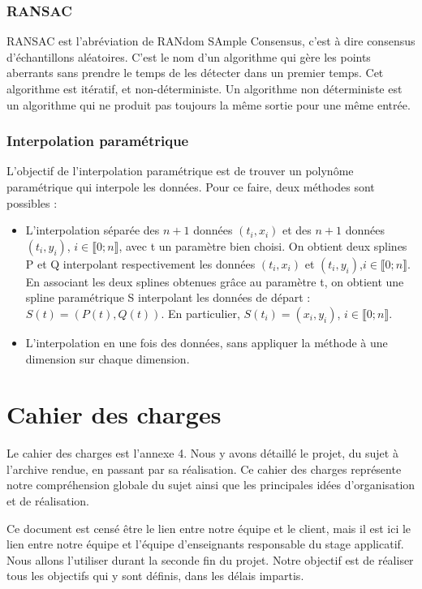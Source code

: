 \documentclass[a4paper,12pt]{article} %
\begin{document}
\subsubsection*{RANSAC}

RANSAC est l'abréviation de RANdom SAmple Consensus, c'est à dire consensus d'échantillons aléatoires. C'est le nom d'un algorithme qui gère les points aberrants sans prendre le temps de les détecter dans un premier temps. Cet algorithme est itératif, et non-déterministe. Un algorithme non déterministe est un algorithme qui ne produit pas toujours la même sortie pour une même entrée.

\subsubsection*{Interpolation paramétrique}

L'objectif de l'interpolation paramétrique est de trouver un polynôme paramétrique qui interpole les données. Pour ce faire, deux méthodes sont possibles :
\begin{itemize}
\item L'interpolation séparée des $n+1$ données $(t_i,x_i)$ et des $n+1$ données $(t_i,y_i)$, $i\in\llbracket 0; n \rrbracket$, avec t un paramètre bien choisi. On obtient deux splines P et Q interpolant respectivement les données $(t_i,x_i)$ et $(t_i,y_i)$,$i\in\llbracket 0; n \rrbracket$. En associant les deux splines obtenues grâce au paramètre t, on obtient une spline paramétrique S interpolant les données de départ : $S(t) = (P(t),Q(t))$. En particulier, $S(t_i) = (x_i,y_i)$, $i\in\llbracket 0; n \rrbracket$.
\item L'interpolation en une fois des données, sans appliquer la méthode à une dimension sur chaque dimension.
\end{itemize}


\section{Cahier des charges}

Le cahier des charges est l'annexe 4. Nous y avons détaillé le projet, du sujet à l'archive rendue, en passant par sa réalisation. Ce cahier des charges représente notre compréhension globale du sujet ainsi que les principales idées d'organisation et de réalisation.

Ce document est censé être le lien entre notre équipe et le client, mais il est ici le lien entre notre équipe et l'équipe d'enseignants responsable du stage applicatif. Nous allons l'utiliser durant la seconde fin du projet. Notre objectif est de réaliser tous les objectifs qui y sont définis, dans les délais impartis.
\end{document}
